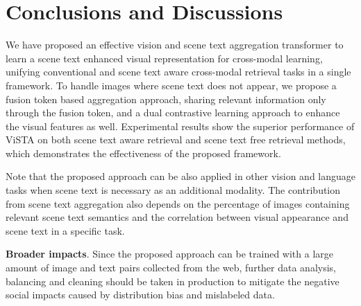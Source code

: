 \documentclass[10pt,twocolumn,letterpaper]{article}
\begin{document}
\vspace{-0.5em}
\section{Conclusions and Discussions}
We have proposed an effective vision and scene text aggregation transformer to learn a scene text enhanced visual representation for cross-modal learning, unifying conventional and scene text aware cross-modal retrieval tasks in a single framework. To handle images where scene text does not appear, we propose a fusion token based aggregation approach, sharing relevant information only through the fusion token, and a dual contrastive learning approach to enhance the visual features as well. Experimental results show the superior performance of ViSTA on both scene text aware retrieval and scene text free retrieval methods, which demonstrates the effectiveness of the proposed framework. 

Note that the proposed approach can be also applied in other vision and language tasks when scene text is necessary as an additional modality. The contribution from scene text aggregation also depends on the percentage of images containing relevant scene text semantics and the correlation between visual appearance and scene text in a specific task. 


\noindent\textbf{Broader impacts}. Since the proposed approach can be trained with a large amount of image and text pairs collected from the web, further data analysis, balancing and cleaning should be taken in production to mitigate the negative social impacts caused by distribution bias and mislabeled data.




{\small
\normalem


}
\end{document}
